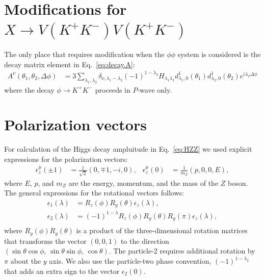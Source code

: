 \documentclass[prd,preprintnumbers,floatfix,
nofootinbib,superscriptaddress]{revtex4}
\begin{document}
\appendix

\section{Modifications for $X\to V(K^+K^-)V(K^+K^-)$}

The only place that requires modification when the $\phi\phi$ system is considered
is the decay matrix element in Eq.~\eqref{eq:decay.A}:
\begin{align}
  A^{\nu}(\theta_1,\theta_2,\Delta\phi) &= 3
  \sum_{\lambda_1,\lambda_2}
  \delta_{\nu,\lambda_1-\lambda_2} (-1)^{1-\lambda_2}
  H_{\lambda_1\lambda_2}
  d_{\lambda_1,0}^{1}(\theta_1) d_{\lambda_2,0}^{1}(\theta_2)
  e^{i\lambda_2 \Delta\phi}
\end{align}
where the decay $\phi\to K^+K^-$ proceeds in $P$-wave only.

\section{Polarization vectors}

For calculation of the Higgs decay ampluitude in Eq.~\eqref{eq:HZZ}
we used explicit expressions for the polarization vectors:
\begin{align}
  \epsilon_z^{\mu}(\pm1) &= \frac{1}{\sqrt{2}} \left( 0,\mp 1,-i,0 \right), &
  \epsilon_z^{\mu}(0) &= \frac{1}{m_Z} \left(p,0,0,E\right),
\end{align}
where $E$, $p$, and $m_Z$ are the energy, momentum, and the mass of the $Z$ boson.
The general expressions for the rotational vectors follows:
\begin{align}
  \epsilon_1(\lambda) &= R_z(\phi) R_y(\theta) \epsilon_z(\lambda),\\
  \epsilon_2(\lambda) &= (-1)^{1-\lambda} R_z(\phi) R_y(\theta) R_y(\pi) \epsilon_z(\lambda),\\
\end{align}
where $R_y(\phi)R_y(\theta)$ is a product of the three-dimensional rotation matrices
that transforms the vector $(0,0,1)$ to the direction $(\sin\theta\cos\phi,\,\sin\theta\sin\phi,\,\cos\theta)$.
The particle-2 requires additional rotation by $\pi$ about the $y$ axis. We also use the particle-two phase convention,
$(-1)^{1-\lambda_2}$ that adds an extra sign to the vector $\epsilon_2(0)$.
\end{document}
